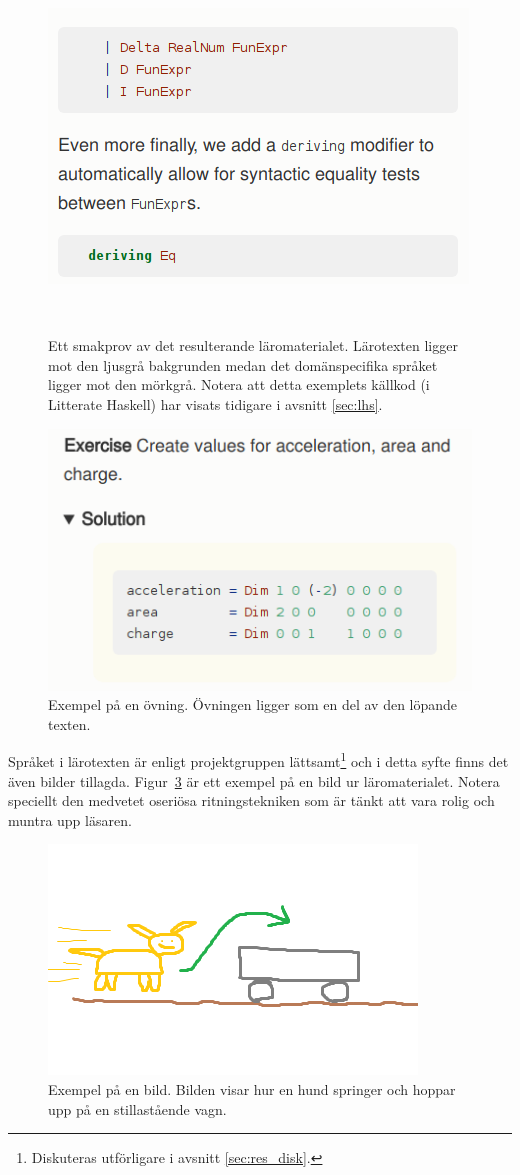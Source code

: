 \begin{figure}[tph]
  \centering
  \includegraphics[width=\linewidth]{figure/smakprov_laromaterial.png}
  \caption{Ett smakprov av det resulterande läromaterialet. Lärotexten ligger mot den ljusgrå bakgrunden medan det domänspecifika språket ligger mot den mörkgrå. Notera att detta exemplets källkod (i Litterate Haskell) har visats tidigare i avsnitt \ref{sec:lhs}.}~\label{fig:smakprov_laromaterial}
\end{figure}

\begin{figure}[tph]
    \centering
    \includegraphics[width=0.4\linewidth]{figure/smakprov_ovning.png}
    \caption{Exempel på en övning. Övningen ligger som en del av den löpande texten.}
    \label{fig:smakprov_ovning}
\end{figure}

Språket i lärotexten är enligt projektgruppen lättsamt\footnote{Diskuteras utförligare i avsnitt \ref{sec:res_disk}.} och i detta syfte finns det även bilder tillagda. Figur~\ref{fig:smakprov_bild_laromaterial} är ett exempel på en bild ur
läromaterialet. Notera speciellt den medvetet oseriösa ritningstekniken som är tänkt att vara rolig och muntra upp läsaren.

\begin{figure}[tph]
        \centering
        \includegraphics[width=0.4\linewidth]{figure/smakprov_bild_laromaterial.png}
        \caption{Exempel på en bild. Bilden visar hur en hund springer och hoppar upp på en stillastående vagn.}
        \label{fig:smakprov_bild_laromaterial}
\end{figure}


